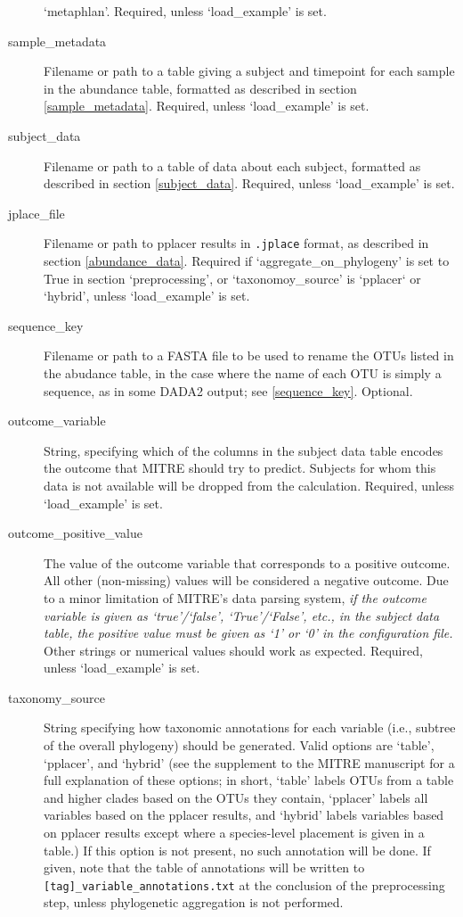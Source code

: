 \documentclass[12pt]{report}
\begin{document}
\begin{description}
  `metaphlan'. Required, unless `load\_example' is set.
\item[sample\_metadata]
  Filename or path to a table giving a subject and timepoint for each
  sample in the abundance table, formatted as described in section
  \ref{sample_metadata}. Required, unless `load\_example' is set.
\item[subject\_data]
  Filename or path to a table of data about each subject,
  formatted as described in section
  \ref{subject_data}. Required, unless `load\_example' is set.
\item[jplace\_file] Filename or path to pplacer results in
  \texttt{.jplace} format, as described in section
  \ref{abundance_data}. Required if `aggregate\_on\_phylogeny' is set
  to True in section `preprocessing', or `taxonomoy\_source' is
  `pplacer` or `hybrid', unless `load\_example' is set.
\item[sequence\_key]
  Filename or path to a FASTA file to be used to rename
  the OTUs listed in the abudance table, in the case where
  the name of each OTU is simply a sequence, as in some DADA2 output;
  see \ref{sequence_key}. Optional.
\item[outcome\_variable] String, specifying which of the columns in
  the subject data table encodes the outcome that MITRE should try to
  predict. Subjects for whom this data is not available will be
  dropped from the calculation.  Required, unless `load\_example' is
  set.
\item[outcome\_positive\_value] The value of the outcome variable that
  corresponds to a positive outcome. All other (non-missing) values
  will be considered a negative outcome. Due to a minor limitation of
  MITRE's data parsing system, \textit{if the outcome variable is
    given as `true'/`false', `True'/`False', etc., in the subject data
    table, the positive value must be given as `1' or `0' in the
    configuration file.}  Other strings or numerical values should
  work as expected. Required, unless `load\_example' is set.
  
\item[taxonomy\_source] String specifying how taxonomic annotations
  for each variable (i.e., subtree of the overall phylogeny) should be
  generated. Valid options are `table', `pplacer', and `hybrid' (see
  the supplement to the MITRE manuscript for a full explanation of
  these options; in short, `table' labels OTUs from a table and higher
  clades based on the OTUs they contain, `pplacer' labels all
  variables based on the pplacer results, and `hybrid' labels
  variables based on pplacer results except where a species-level
  placement is given in a table.) If this option is not present, no
  such annotation will be done. If given, note that the table of
  annotations will be written to
  \texttt{[tag]\_variable\_annotations.txt} at the conclusion of the
  preprocessing step, unless phylogenetic aggregation is not
  performed.


\end{description}
\end{document}
